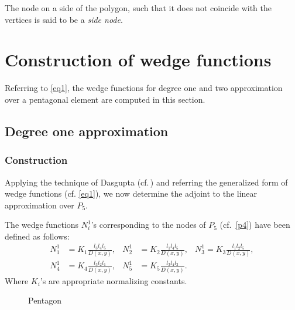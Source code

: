 \begin{definition}
  The node on a side of the polygon, such that it does not coincide with
  the vertices is said to be a \emph{side node}.
\end{definition}

\section{Construction of wedge functions}\label{sec3}
Referring to \autoref{eq1}, the wedge functions for degree one and two
approximation over a pentagonal element are  computed in this section.

\subsection{Degree one approximation}

\subsubsection{Construction}

Applying the technique of Dasgupta (cf.\,\cite{das}) and referring the
generalized form of wedge functions (cf. \autoref{eq1}), we now determine the
adjoint to the linear approximation over $P_5$.

The wedge functions $N_i^1$\rq{}s corresponding to the nodes of $P_5$
(cf.~\autoref{p4}) have been defined as follows:
\begin{equation}
  \begin{aligned}\label{d2}
    N_1^1&=K_1\frac{l_{3}l_{4}l_{5}}{D(x,y)},
    &N_2^1&=K_2\frac{l_{1}l_{4}l_{5}}{D(x,y)},
    &N_3^1=K_3\frac{l_{1}l_{2}l_{5}}{D(x,y)},\\
    N_4^1&=K_4\frac{l_{3}l_{2}l_{1}}{D(x,y)},
    &N_5^1&=K_5\frac{l_{3}l_{4}l_{2}}{D(x,y)}.
  \end{aligned}
\end{equation}
Where $K_i$'s are appropriate normalizing constants.
\begin{figure}[t!]
  \centering
  \caption{Pentagon}\label{p4}
\end{figure}

